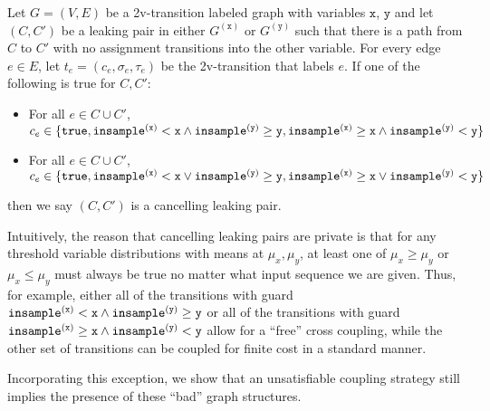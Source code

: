 \begin{defn}
    Let $G = (V, E)$ be a 2v-transition labeled graph with variables $\texttt{x}$, $\texttt{y}$ and let $(C, C')$ be a leaking pair in either $G^{(\texttt{x})}$ or $G^{(\texttt{y})}$ such that there is a path from $C$ to $C'$ with no assignment transitions into the other variable. For every edge $e\in E$, let $t_e = (c_e, \sigma_e, \tau_e)$ be the 2v-transition that labels $e$. 
    If one of the following is true for $C, C'$: \begin{itemize}
        \item For all $e\in C\cup C'$, $c_e \in \{\texttt{true}, \mvlguard[\texttt{x}]\land\mvgguard[\texttt{y}], \mvgguard[\texttt{x}]\land\mvlguard[\texttt{y}]\}$
        \item For all $e\in C\cup C'$, $c_e \in \{\texttt{true}, \mvlguard[\texttt{x}]\lor\mvgguard[\texttt{y}], \mvgguard[\texttt{x}]\lor\mvlguard[\texttt{y}]\}$
\end{itemize}
then we say $(C, C')$ is a cancelling leaking pair. 
\end{defn}

Intuitively, the reason that cancelling leaking pairs are private is that for any threshold variable distributions with means at $\mu_x,\mu_y$, at least one of $\mu_x\geq\mu_y$ or $\mu_x\leq \mu_y$ must always be true no matter what input sequence we are given. 
Thus, for example, either all of the transitions with guard $\mvlguard[\texttt{x}]\land\mvgguard[\texttt{y}]$ or all of the transitions with guard $\mvgguard[\texttt{x}]\land\mvlguard[\texttt{y}]$ allow for a ``free'' cross coupling, while the other set of transitions can be coupled for finite cost in a standard manner.

Incorporating this exception, we show that an unsatisfiable coupling strategy still implies the presence of these ``bad'' graph structures. 

